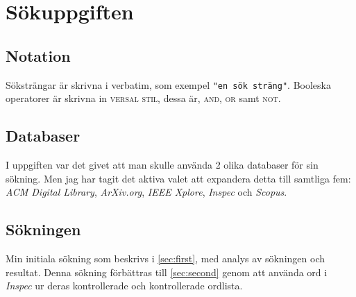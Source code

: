 \documentclass[a4paper,11pt,exjobb]{kth-mag}
\title{\thetitle}
\subtitle{*kryptovalutor är fullt digitala valutor som förlitar sig på kryptografi för att skapa och administreras. Största och mest kända heter Bitcoin (\textbaht, BTC, XBT).}
\author{Petter Salminen}
\date{\today}
\begin{document}
\frontmatter
\maketitle


%

\clearpage
%

%
%
%

\clearpage
\tableofcontents
\newpage

\mainmatter
\pagestyle{plain}
\chapter{Sökuppgiften}
\section{Notation}

Söksträngar är skrivna i verbatim, som exempel \verb="en sök sträng"=. Booleska operatorer är skrivna in \textsc{versal stil}, dessa är, \textsc{and}, \textsc{or} samt \textsc{not}.

\section{Databaser}
I uppgiften var det givet att man skulle använda 2 olika databaser för sin sökning. Men jag har tagit det aktiva valet att expandera detta till samtliga fem:
\textit{ACM Digital Library}\cite{ACM}, \textit{ArXiv.org}\cite{arxiv}, \textit{IEEE Xplore}\cite{IEEE}, \textit{Inspec}\cite{inspec} och \textit{Scopus}\cite{scopus}.

\section{Sökningen}
Min initiala sökning som beskrivs i \ref{sec:first}, med analys av sökningen och resultat. Denna sökning förbättras till \ref{sec:second} genom att använda ord i \textit{Inspec} ur deras kontrollerade och kontrollerade ordlista.
\end{document}
